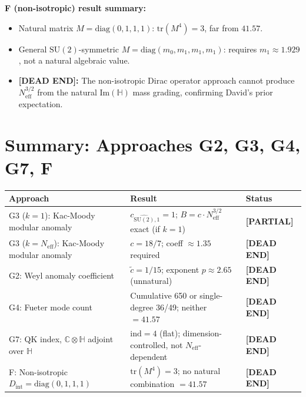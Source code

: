 \documentclass[11pt,a4paper]{article}
\theoremstyle{definition}
\theoremstyle{remark}
\begin{document}
\textbf{F (non-isotropic) result summary:}
\begin{itemize}
  \item Natural matrix $M = \mathrm{diag}(0,1,1,1)$:
    $\mathrm{tr}(M^4) = 3$, far from $41.57$.
  \item General $\mathrm{SU}(2)$-symmetric $M = \mathrm{diag}(m_0, m_1, m_1, m_1)$:
    requires $m_1 \approx 1.929$, not a natural algebraic value.
  \item \textbf{[DEAD END]:} The non-isotropic Dirac operator approach
    cannot produce $N_{\mathrm{eff}}^{3/2}$ from the natural
    $\mathrm{Im}(\mathbb{H})$ mass grading, confirming David's prior
    expectation.
\end{itemize}

\section{Summary: Approaches G2, G3, G4, G7, F}
\label{sec:summary_G}

\begin{center}
\begin{tabular}{lll}
  \toprule
  Approach & Result & Status \\
  \midrule
  G3 ($k=1$): Kac-Moody modular anomaly
    & $c_{\widehat{\mathrm{SU}(2)},1} = 1$;
      $B = c \cdot N_{\mathrm{eff}}^{3/2}$ exact (if $k=1$)
    & \textbf{[PARTIAL]} \\
  G3 ($k=N_{\mathrm{eff}}$): Kac-Moody modular anomaly
    & $c = 18/7$; coeff $\approx 1.35$ required
    & \textbf{[DEAD END]} \\
  G2: Weyl anomaly coefficient
    & $\tilde{c} = 1/15$; exponent $p \approx 2.65$ (unnatural)
    & \textbf{[DEAD END]} \\
  G4: Fueter mode count
    & Cumulative 650 or single-degree 36/49; neither $= 41.57$
    & \textbf{[DEAD END]} \\
  G7: QK index, $\mathbb{C}\otimes\mathbb{H}$ adjoint over $\mathbb{H}$
    & $\mathrm{ind} = 4$ (flat); dimension-controlled, not $N_{\mathrm{eff}}$-dependent
    & \textbf{[DEAD END]} \\
  F: Non-isotropic $D_{\mathrm{int}} = \mathrm{diag}(0,1,1,1)$
    & $\mathrm{tr}(M^4) = 3$; no natural combination $= 41.57$
    & \textbf{[DEAD END]} \\
  \bottomrule
\end{tabular}
\end{center}
\end{document}
